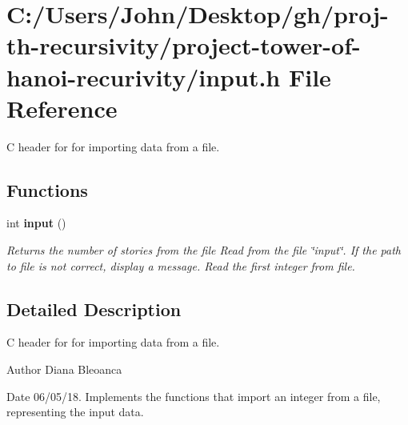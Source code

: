 \section{C\+:/\+Users/\+John/\+Desktop/gh/proj-\/th-\/recursivity/project-\/tower-\/of-\/hanoi-\/recurivity/input.h File Reference}
\label{input_8h}


C header for for importing data from a file.  


\subsection*{Functions}
\begin{DoxyCompactItemize}
\item 
\mbox{\label{input_8h_ab0565bc395d5cc3c0d76e4fd26e3c87f}} 
int \textbf{ input} ()
\begin{DoxyCompactList}\small\item\em Returns the number of stories from the file Read from the file \char`\"{}input\char`\"{}. If the path to file is not correct, display a message. Read the first integer from file. \end{DoxyCompactList}\end{DoxyCompactItemize}


\subsection{Detailed Description}
C header for for importing data from a file. 

\begin{DoxyAuthor}{Author}
Diana Bleoanca 
\end{DoxyAuthor}
\begin{DoxyDate}{Date}
06/05/18. Implements the functions that import an integer from a file, representing the input data. 
\end{DoxyDate}

